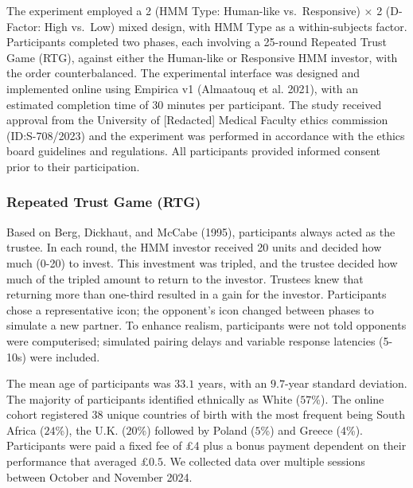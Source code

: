 \documentclass[
]{article}
\begin{document}
The experiment employed a 2 (HMM Type: Human-like vs.~Responsive) × 2 (D-Factor: High vs.~Low) mixed design, with HMM Type as a within-subjects factor. Participants completed two phases, each involving a 25-round Repeated Trust Game (RTG), against either the Human-like or Responsive HMM investor, with the order counterbalanced.
The experimental interface was designed and implemented online using Empirica v1 (Almaatouq et al. 2021), with an estimated completion time of 30 minutes per participant. The study received approval from the University of {[}Redacted{]} Medical Faculty ethics commission (ID:S-708/2023) and the experiment was performed in accordance with the ethics board guidelines and regulations. All participants provided informed consent prior to their participation.

\subsubsection{Repeated Trust Game (RTG)}\label{repeated-trust-game-rtg}

Based on Berg, Dickhaut, and McCabe (1995), participants always acted as the trustee. In each round, the HMM investor received 20 units and decided how much (0-20) to invest. This investment was tripled, and the trustee decided how much of the tripled amount to return to the investor. Trustees knew that returning more than one-third resulted in a gain for the investor. Participants chose a representative icon; the opponent's icon changed between phases to simulate a new partner. To enhance realism, participants were not told opponents were computerised; simulated pairing delays and variable response latencies (5-10s) were included.

The mean age of participants was \(33.1\) years, with an \(9.7\)-year standard deviation. The majority of participants identified ethnically as White (\(57\)\%). The online cohort registered \(38\) unique countries of birth with the most frequent being South Africa (\(24\)\%), the U.K. (\(20\)\%) followed by Poland (\(5\)\%) and Greece (\(4\)\%). Participants were paid a fixed fee of £4 plus a bonus payment dependent on their performance that averaged £\(0.5\). We collected data over multiple sessions between October and November 2024.
\end{document}
